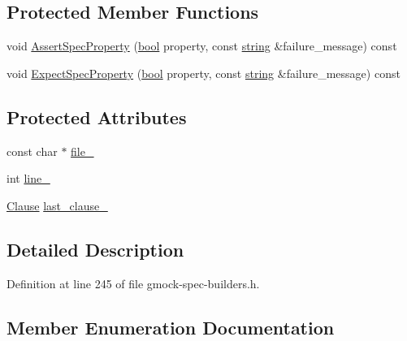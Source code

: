\subsection*{Protected Member Functions}
\begin{DoxyCompactItemize}
\item 
void \hyperlink{classtesting_1_1internal_1_1UntypedOnCallSpecBase_a83d223cf0e48fadc872a7b4062948df4}{Assert\+Spec\+Property} (\hyperlink{classbool}{bool} property, const \hyperlink{namespacetesting_1_1internal_a8e8ff5b11e64078831112677156cb111}{string} \&failure\+\_\+message) const
\item 
void \hyperlink{classtesting_1_1internal_1_1UntypedOnCallSpecBase_a7eeba49b7b2968ebb4859c04684828b2}{Expect\+Spec\+Property} (\hyperlink{classbool}{bool} property, const \hyperlink{namespacetesting_1_1internal_a8e8ff5b11e64078831112677156cb111}{string} \&failure\+\_\+message) const
\end{DoxyCompactItemize}
\subsection*{Protected Attributes}
\begin{DoxyCompactItemize}
\item 
const char $\ast$ \hyperlink{classtesting_1_1internal_1_1UntypedOnCallSpecBase_adf4e6c5022dfeb482f5328e9bb58ba88}{file\+\_\+}
\item 
int \hyperlink{classtesting_1_1internal_1_1UntypedOnCallSpecBase_a1dfa0dafaae6697f17adf5d837ca77c7}{line\+\_\+}
\item 
\hyperlink{classtesting_1_1internal_1_1UntypedOnCallSpecBase_a78ebf16bfee40375e33a983f3100f354}{Clause} \hyperlink{classtesting_1_1internal_1_1UntypedOnCallSpecBase_adb6d19adfeb5fde535d854aedbc5fb0f}{last\+\_\+clause\+\_\+}
\end{DoxyCompactItemize}


\subsection{Detailed Description}


Definition at line 245 of file gmock-\/spec-\/builders.\+h.



\subsection{Member Enumeration Documentation}
\mbox{\label{classtesting_1_1internal_1_1UntypedOnCallSpecBase_a78ebf16bfee40375e33a983f3100f354}} 
